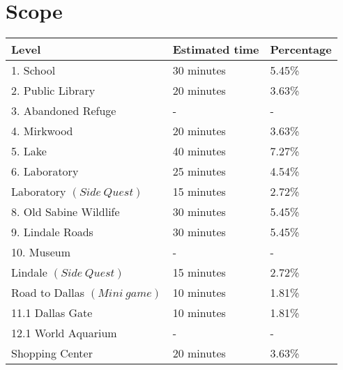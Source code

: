  \section{Scope}

\vspace*{0.5cm}

\begin{center}
	\begin{tabular}[c]{| p{6cm} | p{4cm} | p{3cm} |}
		\hline
		               \textbf{Level}                 & \textbf{Estimated time}     & \textbf{Percentage} \\ \hline
		                  1. School                   & 30 minutes                  & 5.45\%                 \\ \hline
		              2. Public Library               & 20 minutes                  & 3.63\%                 \\ \hline
		             3. Abandoned Refuge              & -			                & -	                  \\ \hline
		                 4. Mirkwood                  & 20 minutes                  & 3.63\%                 \\ \hline
		                   5. Lake                    & 40 minutes                  & 7.27\%                 \\ \hline
		                6. Laboratory                 & 25 minutes                  & 4.54\%                 \\
					 Laboratory $(Side\:Quest)$	  & 15 minutes					& 2.72\%				\\ \hline
		           8. Old Sabine Wildlife             & 30 minutes                  & 5.45\%                 \\ \hline
		              9. Lindale Roads                & 30 minutes                  & 5.45\%                 \\ \hline
		                 10. Museum                   & -              			    & -      	          \\
					Lindale $(Side\:Quest)$			  & 15 minutes					& 2.72\%				  \\ \hline
				Road to Dallas $(Mini\:game)$		  & 10 minutes					& 1.81\%				  \\ \hline
		               11.1 Dallas Gate               & 10 minutes                  & 1.81\%                 \\ \hline
					 12.1 World Aquarium              & -        		     	    & -              	   \\
						 Shopping Center              & 20 minutes                  & 3.63\%                 \\

\end{tabular}
\end{center}
